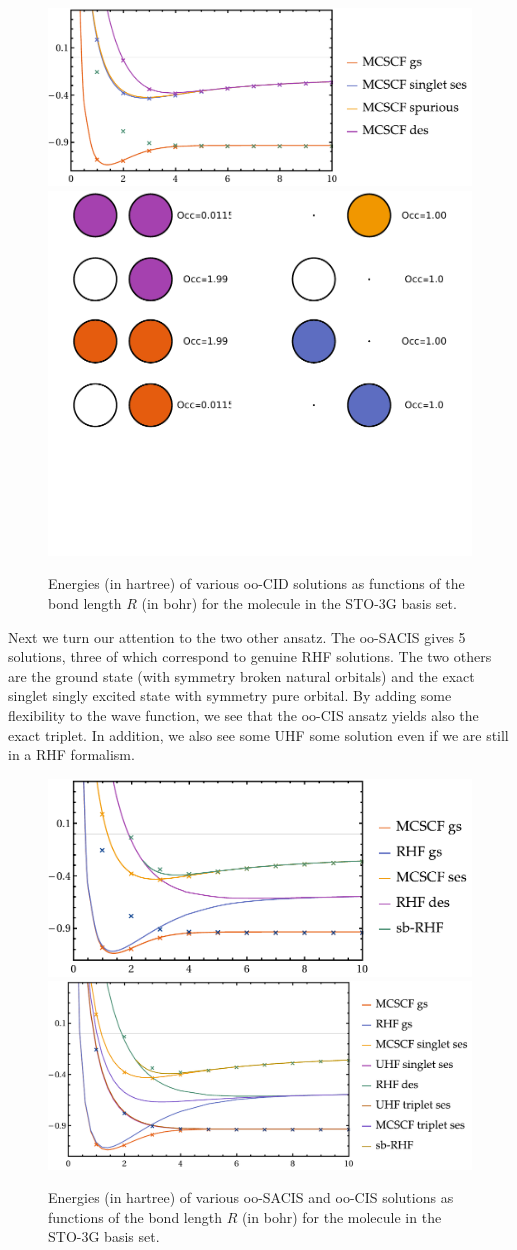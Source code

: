 \documentclass[11pt,a4paper]{article}
\begin{document}
\begin{figure}
  \centering
  \includegraphics[width=0.67\linewidth]{Figures/H2_ooCID_PES}
  \includegraphics[width=0.32\linewidth]{Figures/H2_ooCID_MO}
  \caption{
    Energies (in hartree) of various oo-CID solutions as functions of the bond length $R$ (in bohr) for the  molecule in the STO-3G basis set.
    \label{fig:H2ooCID}}
\end{figure}

Next we turn our attention to the two other ansatz. The oo-SACIS gives 5 solutions, three of which correspond to genuine RHF solutions. The two others are the ground state (with symmetry broken natural  orbitals) and the exact singlet singly excited state with symmetry pure orbital.
By adding some flexibility to the wave function, we see that the oo-CIS ansatz yields also the exact triplet. In addition, we also see some UHF some solution even if we are still in a RHF formalism.
\begin{figure}
  \centering
  \includegraphics[width=0.75\linewidth]{Figures/H2_ooSACIS_PES}
  \includegraphics[width=0.75\linewidth]{Figures/H2_ooCIS_PES}
  \caption{
    Energies (in hartree) of various oo-SACIS and oo-CIS solutions as functions of the bond length $R$ (in bohr) for the  molecule in the STO-3G basis set.
    \label{fig:H2ooCIS}}
\end{figure}
\end{document}
